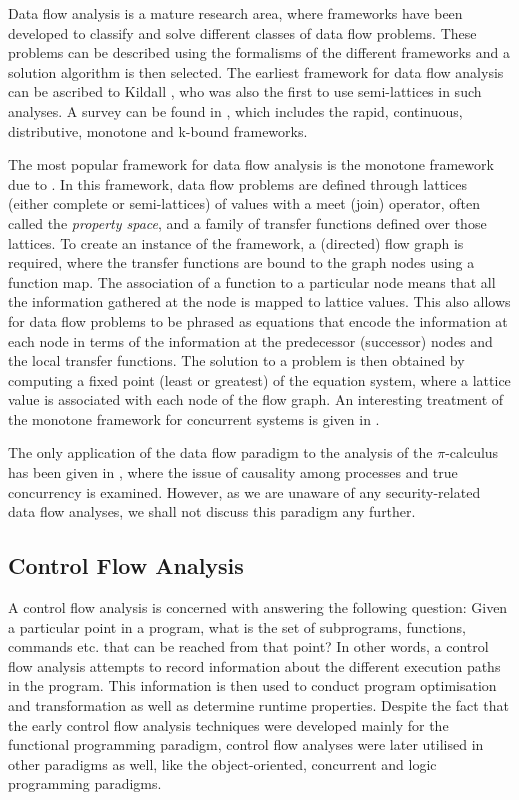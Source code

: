\documentclass[10pt,a4paper,final,oneside,fleqn]{book}
\begin{document}
Data flow analysis is a mature research area, where frameworks have been developed to classify and solve different classes of data flow problems.  These problems can be described using the formalisms of the different frameworks and a solution algorithm is then selected.  The earliest framework for data flow analysis can be ascribed to Kildall \cite{kildall1}, who was also the first to use semi-lattices in such analyses.  A survey can be found in \cite{marlowe1}, which includes the rapid, continuous, distributive, monotone and k-bound frameworks.

The most popular framework for data flow analysis is the monotone framework due to \cite{kam1}.  In this framework, data flow problems are defined through lattices (either complete or semi-lattices) of values with a meet (join) operator, often called the {\itshape property space\/}, and a family of transfer functions defined over those lattices.  To create an instance of the framework, a (directed) flow graph is required, where the transfer functions are bound to the graph nodes using a function map.  The association of a function to a particular node means that all the information gathered at the node is mapped to lattice values.  This also allows for data flow problems to be phrased as equations that encode the information at each node in terms of the information at the predecessor (successor) nodes and the local transfer functions.  The solution to a problem is then obtained by computing a fixed point (least or greatest) of the equation system, where a lattice value is associated with each node of the flow graph.  An interesting treatment of the monotone framework for concurrent systems is given in \cite{dwyer1}.

The only application of the data flow paradigm to the analysis of the $\pi$-calculus has been given in \cite{jaga1}, where the issue of causality among processes and true concurrency is examined.  However, as we are unaware of any security-related data flow analyses, we shall not discuss this paradigm any further.
\subsection{Control Flow Analysis\label{sect:introcontrol}}
A control flow analysis is concerned with answering the following question:  Given a particular point in a program, what is the set of subprograms, functions, commands etc. that can be reached from that point?  In other words, a control flow analysis attempts to record information about the different execution paths in the program.  This information is then used to conduct program optimisation and transformation as well as determine runtime properties.  Despite the fact that the early control flow analysis techniques were developed mainly for the functional programming paradigm, control flow analyses were later utilised in other paradigms as well, like the object-oriented, concurrent and logic programming paradigms.
\end{document}
